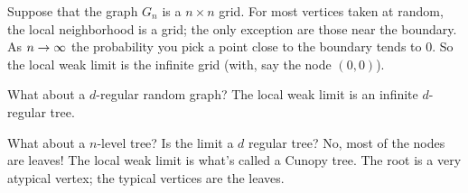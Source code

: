 Suppose that the graph $G_n$ is a $n\times n$ grid. For most vertices taken at random, the local neighborhood is a grid; the only exception are those near the boundary. As $n\to \infty$ the probability you pick a point close to the boundary tends to 0. So the local weak limit is the infinite grid (with, say the node $(0,0)$).

What about a $d$-regular random graph? The local weak limit is an infinite $d$-regular tree.

What about a $n$-level tree? Is the limit a $d$ regular tree? No, most of the nodes are leaves! The local weak limit is what's called a Cunopy tree. The root is a very atypical vertex; the typical vertices are the leaves.











